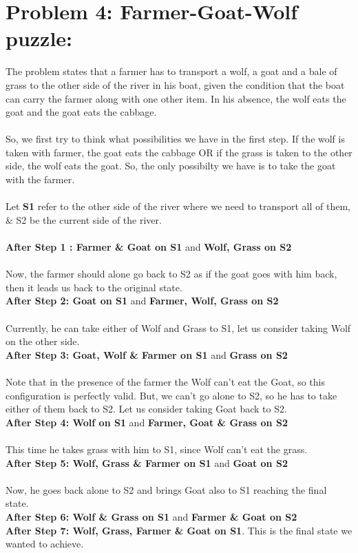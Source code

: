 \documentclass[12pt]{report}
\begin{document}
\section{Problem 4: Farmer-Goat-Wolf puzzle:}
The problem states that a farmer has to transport a wolf, a goat and a bale of grass to the other side of the river  in his boat, given the condition that the boat can carry the farmer along with one other item. In his absence, the wolf eats the goat and the goat eats the cabbage. 
\\\\
So, we first try to think what possibilities we have in the first step. If the wolf is taken with farmer, the goat eats the cabbage OR if the grass is taken to the other side, the wolf eats the goat. So, the only possibilty we have is to take the goat with the farmer. 
\\\\
Let \textbf{S1} refer to the other side of the river where we need to transport all of them, \& S2 be the current side of the river. 
\\\\
\textbf{After Step 1 : Farmer \& Goat on S1} and \textbf{Wolf, Grass on S2} 
\\\\ 
Now, the farmer should alone go back to S2 as if the goat goes with him back, then it leads us back to the original state.
\\ 
\textbf{After Step 2: Goat on S1} and \textbf{Farmer, Wolf, Grass on S2}
\\\\
Currently, he can take either of Wolf and Grass to S1, let us consider taking Wolf on the other side. 
\\ 
\textbf{After Step 3: Goat, Wolf \& Farmer on S1} and \textbf{Grass on S2}
\\\\
Note that in the presence of the farmer the Wolf can't eat the Goat, so this configuration is perfectly valid. But, we can't go alone to S2, so he has to take either of them back to S2. Let us consider taking Goat back to S2. 
\\
\textbf{After Step 4: Wolf on S1} and \textbf{Farmer, Goat \& Grass on S2}
\\\\
This time he takes grass with him to S1, since Wolf can't eat the grass.
\\
\textbf{After Step 5: Wolf, Grass \& Farmer on S1} and \textbf{Goat on S2}
\\\\
Now, he goes back alone to S2 and brings Goat also to S1 reaching the final state. 
\\
\textbf{After Step 6: Wolf \& Grass on S1} and \textbf{Farmer \& Goat on S2}
\\
\textbf{After Step 7: Wolf, Grass, Farmer \& Goat on S1}. This is the final state we wanted to achieve. 
\end{document}
